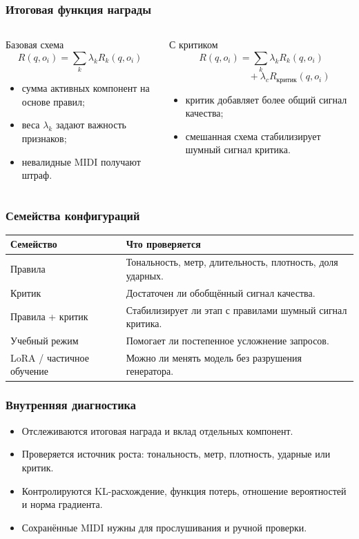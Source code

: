 \documentclass[aspectratio=169]{beamer}
\begin{document}
\begin{frame}
\frametitle{Итоговая функция награды}
\begin{columns}
\begin{block}{Базовая схема}
\[
R(q,o_i)=\sum_k \lambda_k R_k(q,o_i)
\]
\begin{itemize}
    \item сумма активных компонент на основе правил;
    \item веса $\lambda_k$ задают важность признаков;
    \item невалидные MIDI получают штраф.
\end{itemize}
\end{block}

\begin{block}{С критиком}
\[
R(q,o_i)=
\sum_k \lambda_k R_k(q,o_i)
\]
\[
\phantom{R(q,o_i)=}\;+
\lambda_c R_{\text{критик}}(q,o_i)
\]
\begin{itemize}
    \item критик добавляет более общий сигнал качества;
    \item смешанная схема стабилизирует шумный сигнал критика.
\end{itemize}
\end{block}
\end{columns}
\end{frame}



\begin{frame}
\frametitle{Семейства конфигураций}
\small
\begin{tabular}{p{} p{}}
\toprule
\textbf{Семейство} & \textbf{Что проверяется} \\
\midrule
Правила & Тональность, метр, длительность, плотность, доля ударных. \\
Критик & Достаточен ли обобщённый сигнал качества. \\
Правила + критик & Стабилизирует ли этап с правилами шумный сигнал критика. \\
Учебный режим & Помогает ли постепенное усложнение запросов. \\
LoRA / частичное обучение & Можно ли менять модель без разрушения генератора. \\
\bottomrule
\end{tabular}
\end{frame}

\begin{frame}
\frametitle{Внутренняя диагностика}
\begin{itemize}
    \item Отслеживаются итоговая награда и вклад отдельных компонент.
    \item Проверяется источник роста: тональность, метр, плотность, ударные или критик.
    \item Контролируются KL-расхождение, функция потерь, отношение вероятностей и норма градиента.
    \item Сохранённые MIDI нужны для прослушивания и ручной проверки.
\end{itemize}
\end{frame}
\end{document}

